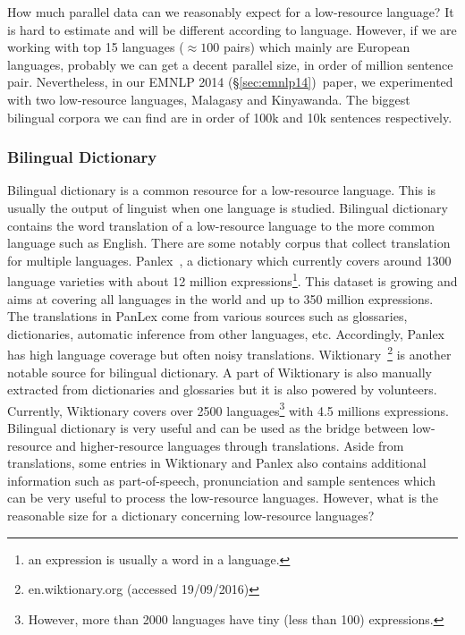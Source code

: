 \documentclass[12pt,twoside,final,hidelinks]{ltthesis}
\theoremstyle{definition}
\newcommand\emnlpiv{EMNLP 2014 (\S\ref{sec:emnlp14})}
\begin{document}
How much parallel data can we reasonably expect for a low-resource language? It is hard to 
estimate and will be different according to language. However, if we are working with top 15 
languages ($\approx100$ pairs) which mainly are European languages, probably we can get a 
decent parallel size, in order of million sentence pair. Nevertheless, in our \emnlpiv\ paper, 
we experimented with two low-resource languages, Malagasy and Kinyawanda. The biggest bilingual 
corpora we can find are in order of 100k and 10k sentences respectively.






\subsubsection{Bilingual Dictionary}
Bilingual dictionary is a common resource for a low-resource language. This is usually the output of linguist when one language is studied. Bilingual dictionary contains the word translation of a low-resource language to the more common language such as English. 
There are some notably corpus that collect translation for multiple languages. 
Panlex~\cite{Kamholz14}, a dictionary which currently covers around 1300 language varieties with about 12 million expressions\footnote{an expression is usually a word in a language.}. This dataset is growing and aims at covering all languages in the world and up to 350 million expressions. 
The translations in PanLex come from various sources such as glossaries, dictionaries, automatic inference from other languages, etc. 
Accordingly, Panlex has high language coverage but often noisy translations.
Wiktionary~\footnote{en.wiktionary.org (accessed 19/09/2016)} is another notable source for bilingual dictionary. A part of Wiktionary 
is also manually extracted from dictionaries and glossaries but it is also powered by 
volunteers. Currently, Wiktionary covers over 2500 languages\footnote{However, more than 2000 languages have tiny (less than 100) expressions.} with 4.5 millions expressions. 
Bilingual dictionary is very useful and can be used as the bridge between low-resource and higher-resource languages through translations. Aside from translations, some entries in Wiktionary and Panlex also contains additional information such as part-of-speech, pronunciation and sample sentences which can be very useful to process the low-resource languages. 
However, what is the reasonable size for a dictionary concerning low-resource languages? 
\end{document}
